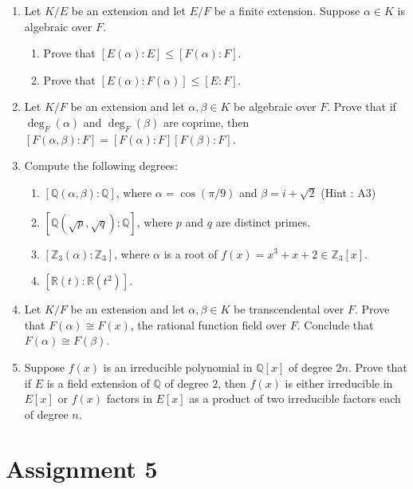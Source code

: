\documentclass[notoc,notitlepage,nobib]{tufte-book}
\begin{document}
\begin{enumerate}
  \item Let $K / E$ be an extension and let $E / F$ be a finite extension.
    Suppose $\alpha \in K$ is algebraic over $F$.
    \begin{enumerate}
      \item Prove that $[E(\alpha) : E] \leq [F(\alpha) : F]$.
      \item Prove that $[E(\alpha) : F(\alpha)] \leq [E : F]$.
    \end{enumerate}
  \item Let $K / F$ be an extension and let $\alpha, \beta \in K$ be algebraic
    over $F$. Prove that if $\deg_F(\alpha)$ and $\deg_F(\beta)$ are coprime,
    then $[F(\alpha, \beta) : F] = [F(\alpha) : F][F(\beta) : F]$.
  \item Compute the following degrees:
    \begin{enumerate}
      \item $[\mathbb{Q}(\alpha, \beta) : \mathbb{Q}]$, where $\alpha = \cos(\pi
        / 9)$ and $\beta = i + \sqrt{2}$ (Hint : A3)
      \item $[\mathbb{Q}(\sqrt{p}, \sqrt{q}) : \mathbb{Q}]$, where $p$ and $q$
        are distinct primes.
      \item $[\mathbb{Z}_3(\alpha) : \mathbb{Z}_3]$, where $\alpha$ is a root of
        $f(x) = x^3 + x + 2 \in \mathbb{Z}_3[x]$.
      \item $[\mathbb{R}(t) : \mathbb{R}(t^2)]$.
    \end{enumerate}
  \item Let $K / F$ be an extension and let $\alpha, \beta \in K$ be
    transcendental over $F$. Prove that $F(\alpha) \cong F(x)$, the rational
    function field over $F$. Conclude that $F(\alpha) \cong F(\beta)$.
  \item Suppose $f(x)$ is an irreducible polynomial in $\mathbb{Q}[x]$ of degree
    $2n$. Prove that if $E$ is a field extension of $\mathbb{Q}$ of degree $2$,
    then $f(x)$ is either irreducible in $E[x]$ or $f(x)$ factors in $E[x]$ as a
    product of two irreducible factors each of degree $n$.
\end{enumerate}


\section{Assignment 5}%
\label{sec:assignment_5}
\end{document}
